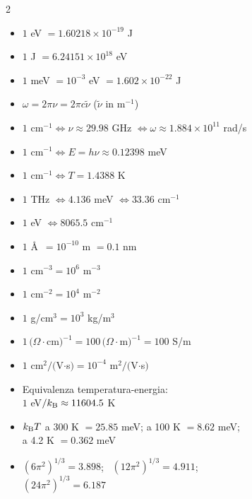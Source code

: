\vspace{0.3cm}
\begin{multicols}{2}
{\small
\begin{itemize}
    \setlength{\itemsep}{1pt}
    \item $1$ eV $= 1.60218\times10^{-19}$ J
    \item $1$ J $= 6.24151\times10^{18}$ eV
    \item $1$ meV $= 10^{-3}$ eV $= 1.602\times10^{-22}$ J
    \item $\omega = 2\pi\nu = 2\pi c\tilde\nu$ \quad ($\tilde\nu$ in m$^{-1}$)
    \item $1$ cm$^{-1} \iff \nu\approx29.98$ GHz $\iff \omega\approx1.884\times10^{11}$ rad/s
    \item $1$ cm$^{-1} \iff E = h\nu \approx 0.12398$ meV
    \item $1$ cm$^{-1} \iff T = 1.4388$ K
    \item $1$ THz $\iff 4.136$ meV $\iff 33.36$ cm$^{-1}$
    \item $1$ eV $\iff 8065.5$ cm$^{-1}$
    \item $1$ \AA\ $= 10^{-10}$ m $= 0.1$ nm
    \item $1$ cm$^{-3} = 10^{6}$ m$^{-3}$
    \item $1$ cm$^{-2} = 10^{4}$ m$^{-2}$
    \item $1$ g/cm$^3 = 10^{3}$ kg/m$^3$
    \item $1\,(\Omega\cdot$cm$)^{-1} = 100\,(\Omega\cdot$m$)^{-1} = 100$ S/m
    \item $1$ cm$^2/($V$\cdot$s$) = 10^{-4}$ m$^2/($V$\cdot$s$)$
    \item Equivalenza temperatura-energia: \\ $1$ eV$/k_{\mathrm{B}} \approx 11604.5$ K
    \item $k_{\mathrm{B}} T$ a 300 K $= 25.85$ meV; a 100 K $= 8.62$ meV; \\ a 4.2 K $= 0.362$ meV
    \item $(6\pi^2)^{1/3}=3.898$; \ $(12\pi^2)^{1/3}=4.911$; \\ $(24\pi^2)^{1/3}=6.187$
\end{itemize}}
\end{multicols}

\newpage
